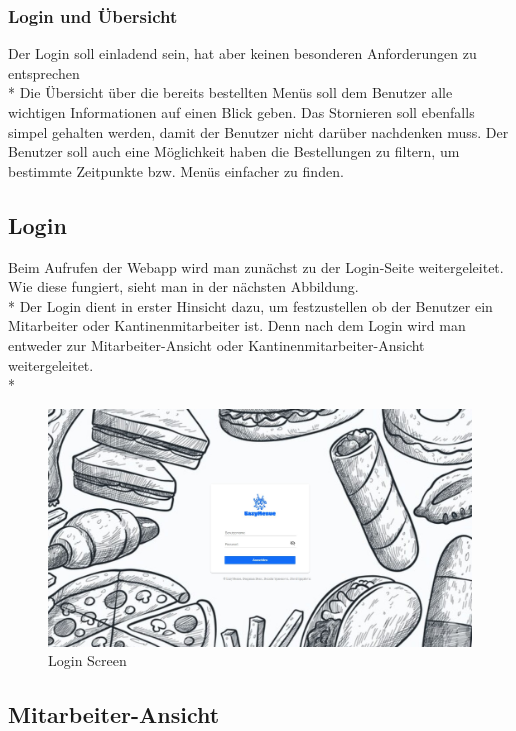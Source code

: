 \subsubsection{Login und Übersicht}
Der Login soll einladend sein, hat aber keinen besonderen Anforderungen zu entsprechen \\*
Die Übersicht über die bereits bestellten Menüs soll dem Benutzer alle wichtigen Informationen auf einen Blick geben.
Das Stornieren soll ebenfalls simpel gehalten werden, damit der Benutzer nicht darüber nachdenken muss.
Der Benutzer soll auch eine Möglichkeit haben die Bestellungen zu filtern, um bestimmte Zeitpunkte bzw. Menüs einfacher zu finden.


\subsection{Login}
Beim Aufrufen der Webapp wird man zunächst zu der Login-Seite weitergeleitet. Wie diese fungiert, sieht man in der nächsten Abbildung. \\*
Der Login dient in erster Hinsicht dazu, um festzustellen ob der Benutzer ein Mitarbeiter oder Kantinenmitarbeiter ist.
Denn nach dem Login wird man entweder zur Mitarbeiter-Ansicht oder Kantinenmitarbeiter-Ansicht weitergeleitet. \\*

\begin{figure}[htp]
    \centering
    \includegraphics[scale=0.3]{pics/login_screen_vue.JPG}
    \caption{Login Screen}
    \label{fig:impl:LoginVue}
\end{figure}


\pagebreak

\subsection {Mitarbeiter-Ansicht}

